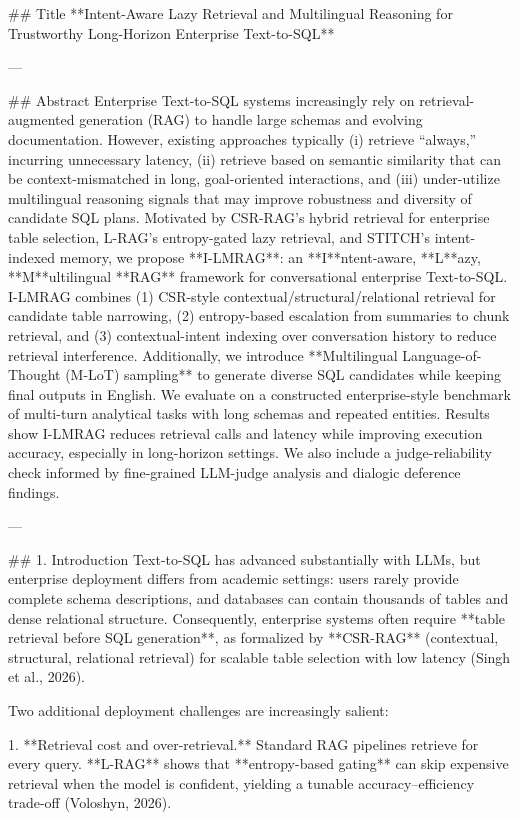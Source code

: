 ## Title  
**Intent-Aware Lazy Retrieval and Multilingual Reasoning for Trustworthy Long-Horizon Enterprise Text-to-SQL**

---

## Abstract  
Enterprise Text-to-SQL systems increasingly rely on retrieval-augmented generation (RAG) to handle large schemas and evolving documentation. However, existing approaches typically (i) retrieve “always,” incurring unnecessary latency, (ii) retrieve based on semantic similarity that can be context-mismatched in long, goal-oriented interactions, and (iii) under-utilize multilingual reasoning signals that may improve robustness and diversity of candidate SQL plans. Motivated by CSR-RAG’s hybrid retrieval for enterprise table selection, L-RAG’s entropy-gated lazy retrieval, and STITCH’s intent-indexed memory, we propose **I-LMRAG**: an **I**ntent-aware, **L**azy, **M**ultilingual **RAG** framework for conversational enterprise Text-to-SQL. I-LMRAG combines (1) CSR-style contextual/structural/relational retrieval for candidate table narrowing, (2) entropy-based escalation from summaries to chunk retrieval, and (3) contextual-intent indexing over conversation history to reduce retrieval interference. Additionally, we introduce **Multilingual Language-of-Thought (M-LoT) sampling** to generate diverse SQL candidates while keeping final outputs in English. We evaluate on a constructed enterprise-style benchmark of multi-turn analytical tasks with long schemas and repeated entities. Results show I-LMRAG reduces retrieval calls and latency while improving execution accuracy, especially in long-horizon settings. We also include a judge-reliability check informed by fine-grained LLM-judge analysis and dialogic deference findings.  

---

## 1. Introduction  
Text-to-SQL has advanced substantially with LLMs, but enterprise deployment differs from academic settings: users rarely provide complete schema descriptions, and databases can contain thousands of tables and dense relational structure. Consequently, enterprise systems often require **table retrieval before SQL generation**, as formalized by **CSR-RAG** (contextual, structural, relational retrieval) for scalable table selection with low latency (Singh et al., 2026).

Two additional deployment challenges are increasingly salient:

1. **Retrieval cost and over-retrieval.** Standard RAG pipelines retrieve for every query. **L-RAG** shows that **entropy-based gating** can skip expensive retrieval when the model is confident, yielding a tunable accuracy–efficiency trade-off (Voloshyn, 2026).

